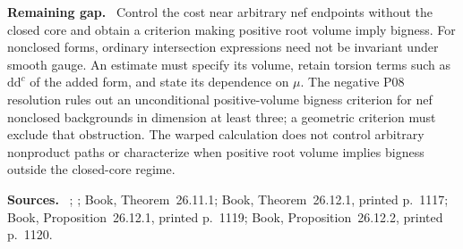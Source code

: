 \documentclass[11pt]{article}
\newcommand{\ddc}{\mathrm d\mathrm d^c}
\newcommand{\field}[1]{\par\medskip\noindent\textbf{#1.}\ }
\begin{document}
\field{Remaining gap} Control the cost near arbitrary nef endpoints without the closed core and obtain a criterion making positive root volume imply bigness. For nonclosed forms, ordinary intersection expressions need not be invariant under smooth gauge. An estimate must specify its volume, retain torsion terms such as $\ddc$ of the added form, and state its dependence on $\mu$. The negative P08 resolution rules out an unconditional positive-volume bigness criterion for nef nonclosed backgrounds in dimension at least three; a geometric criterion must exclude that obstruction. The warped calculation does not control arbitrary nonproduct paths or characterize when positive root volume implies bigness outside the closed-core regime.
\field{Sources} \cite[Theorem 1.1 and Corollary 1.2, version 2]{Tosatti26}; \cite[Theorem 4.12]{GL22}; Book, Theorem~26.11.1; Book, Theorem~26.12.1, printed p.~1117; Book, Proposition~26.12.1, printed p.~1119; Book, Proposition~26.12.2, printed p.~1120.
\end{document}
